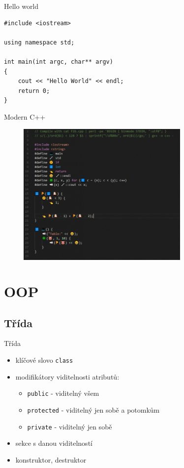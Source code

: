 \documentclass{beamer}
\begin{document}
\begin{xframe}{Hello world}
\begin{lstlisting}
#include <iostream>

using namespace std;

int main(int argc, char** argv)
{
    cout << "Hello World" << endl;
    return 0;
}
\end{lstlisting}
\end{xframe}

\begin{xframe}{Modern C++}
	\begin{figure}
		\centering
		\includegraphics[width=0.75\textwidth]{mcpp.png}
	\end{figure}
\end{xframe}

\section{OOP}
\subsection{Třída}

\begin{xframe}{Třída}
	\begin{itemize}
		\item klíčové slovo \texttt{class}
		\item modifikátory viditelnosti atributů:
			\begin{itemize}
				\item \texttt{public} - viditelný všem
				\item \texttt{protected} - viditelný jen sobě a potomkům
				\item \texttt{private} - viditelný jen sobě
			\end{itemize}
		\item sekce s danou viditelností
		\item konstruktor, destruktor
	\end{itemize}
\end{xframe}
\end{document}
